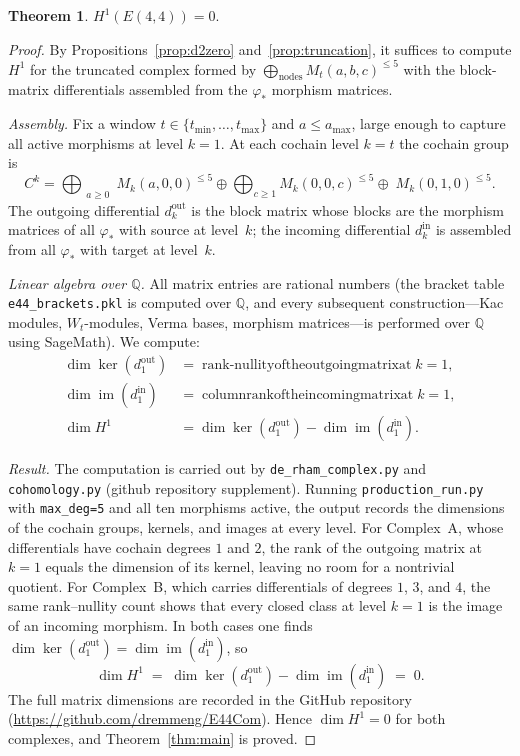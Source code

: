 \documentclass[reqno,10pt]{amsart}
\theoremstyle{definition}
\newtheorem{theor}[subsubsection]{Theorem}
\begin{document}
\begin{theor}\label{thm:h1-vanish}
$H^1(E(4,4)) = 0$.
\end{theor}

\begin{proof}
By Propositions~\ref{prop:d2zero} and~\ref{prop:truncation}, it suffices to
compute $H^1$ for the truncated complex formed by
$\bigoplus_{\text{nodes}} M_t(a,b,c)^{\leq 5}$ with the block-matrix
differentials assembled from the $\varphi_*$ morphism matrices.

\smallskip
\noindent\textit{Assembly.}
Fix a window $t\in\{t_{\min},\ldots,t_{\max}\}$ and $a\leq a_{\max}$, large
enough to capture all active morphisms at level $k=1$.  At each cochain
level $k=t$ the cochain group is
\[
  C^k = \bigoplus_{\substack{a\geq 0}} M_k(a,0,0)^{\leq 5}
        \oplus\bigoplus_{c\geq 1} M_k(0,0,c)^{\leq 5}
        \oplus\; M_k(0,1,0)^{\leq 5}.
\]
The outgoing differential $d^{\text{out}}_k$ is the block matrix whose
blocks are the morphism matrices of all $\varphi_*$ with source at level~$k$;
the incoming differential $d^{\text{in}}_k$ is assembled from all $\varphi_*$
with target at level~$k$.

\smallskip
\noindent\textit{Linear algebra over $\mathbb{Q}$.}
All matrix entries are rational numbers (the bracket table
\texttt{e44\_brackets.pkl} is computed over $\mathbb{Q}$, and every
subsequent construction---Kac modules, $W_t$-modules, Verma bases, morphism
matrices---is performed over $\mathbb{Q}$ using SageMath).  We compute:
\begin{align*}
  \dim\ker(d^{\text{out}}_1) &= \operatorname{rank-nullity of the outgoing matrix at }k=1,\\
  \dim\operatorname{im}(d^{\text{in}}_1) &= \operatorname{column rank of the incoming matrix at }k=1,\\
  \dim H^1 &= \dim\ker(d^{\text{out}}_1) - \dim\operatorname{im}(d^{\text{in}}_1).
\end{align*}

\noindent\textit{Result.}
The computation is carried out by \texttt{de\_rham\_complex.py} and
\texttt{cohomology.py} (github repository supplement).  Running
\texttt{production\_run.py} with \texttt{max\_deg=5} and all ten morphisms
active, the output records the dimensions of the cochain groups, kernels,
and images at every level.  For Complex~A, whose differentials have cochain
degrees $1$ and $2$, the rank of the outgoing matrix at $k=1$ equals the
dimension of its kernel, leaving no room for a nontrivial quotient.
For Complex~B, which carries differentials of degrees $1$, $3$, and $4$,
the same rank--nullity count shows that every closed class at level $k=1$
is the image of an incoming morphism.  In both cases one finds
$\dim\ker(d^{\text{out}}_1) = \dim\operatorname{im}(d^{\text{in}}_1)$,
so
\[
  \dim H^1 \;=\; \dim\ker(d^{\text{out}}_1) - \dim\operatorname{im}(d^{\text{in}}_1) \;=\; 0.
\]
The full matrix dimensions are recorded in the GitHub repository
(\url{https://github.com/dremmeng/E44Com}).
Hence $\dim H^1 = 0$ for both complexes, and Theorem~\ref{thm:main} is
proved.
\end{proof}
\end{document}
